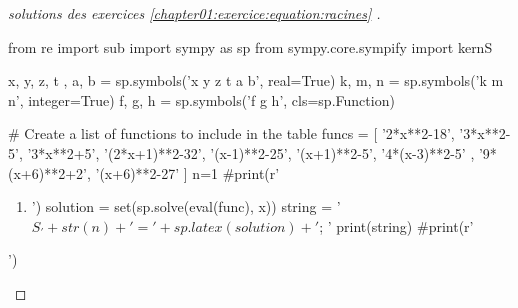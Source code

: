 \documentclass[main.tex]{subfiles}
\begin{document}
\begin{proof}[solutions des exercices \ref{chapter01:exercice:equation:racines} ]   
	\scriptsize
\begin{pycode}
from re import sub
import sympy as sp
from sympy.core.sympify import kernS

x, y, z, t , a, b = sp.symbols('x y z t a b', real=True)
k, m, n = sp.symbols('k m n', integer=True)
f, g, h = sp.symbols('f g h', cls=sp.Function)

# Create a list of functions to include in the table
funcs = [
'2*x**2-18',
'3*x**2-5',
'3*x**2+5',
'(2*x+1)**2-32',
'(x-1)**2-25',
'(x+1)**2-5',
'4*(x-3)**2-5' ,
'9*(x+6)**2+2',
'(x+6)**2-27'
]
n=1
#print(r' \begin{enumerate}[label={$S_{\arabic*}=$},leftmargin=*] ')
for func in funcs:
#	print('\item ')
	solution = set(sp.solve(eval(func), x))
	string =  '$S_'+ str(n)+ '=' +   sp.latex(solution ) + '$; '
	print(string)
#print(r'\end{enumerate}')
\end{pycode}
%
%
\end{proof}  
 
\end{document}
